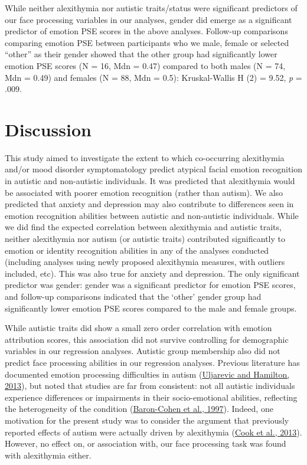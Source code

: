 \documentclass[
]{article}
\begin{document}
While neither alexithymia nor autistic traits/status were significant predictors of our face processing variables in our analyses, gender did emerge as a significant predictor of emotion PSE scores in the above analyses. Follow-up comparisons comparing emotion PSE between participants who we male, female or selected ``other'' as their gender showed that the other group had significantly lower emotion PSE scores (N = 16, Mdn = 0.47) compared to both males (N = 74, Mdn = 0.49) and females (N = 88, Mdn = 0.5): Kruskal-Wallis H (2) = 9.52, \emph{p} = .009.

\hypertarget{discussion}{%
\section*{Discussion}\label{discussion}}

This study aimed to investigate the extent to which co-occurring alexithymia and/or mood disorder symptomatology predict atypical facial emotion recognition in autistic and non-autistic individuals. It was predicted that alexithymia would be associated with poorer emotion recognition (rather than autism). We also predicted that anxiety and depression may also contribute to differences seen in emotion recognition abilities between autistic and non-autistic individuals. While we did find the expected correlation between alexithymia and autistic traits, neither alexithymia nor autism (or autistic traits) contributed significantly to emotion or identity recognition abilities in any of the analyses conducted (including analyses using newly proposed alexithymia measures, with outliers included, etc). This was also true for anxiety and depression. The only significant predictor was gender: gender was a significant predictor for emotion PSE scores, and follow-up comparisons indicated that the `other' gender group had significantly lower emotion PSE scores compared to the male and female groups.

While autistic traits did show a small zero order correlation with emotion attribution scores, this association did not survive controlling for demographic variables in our regression analyses. Autistic group membership also did not predict face processing abilities in our regression analyses. Previous literature has documented emotion processing difficulties in autism (\protect\hyperlink{ref-uljarevic2013a}{Uljarevic and Hamilton, 2013}), but noted that studies are far from consistent: not all autistic individuals experience differences or impairments in their socio-emotional abilities, reflecting the heterogeneity of the condition (\protect\hyperlink{ref-baron-cohen1997a}{Baron-Cohen et al., 1997}). Indeed, one motivation for the present study was to consider the argument that previously reported effects of autism were actually driven by alexithymia (\protect\hyperlink{ref-cook2013a}{Cook et al., 2013}). However, no effect on, or association with, our face processing task was found with alexithymia either.
\end{document}
